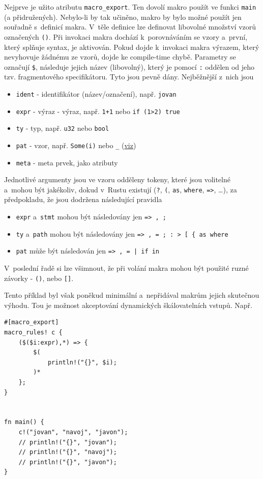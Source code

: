 \documentclass[a4paper, 12pt, twoside]{article} %
\newcommand{\rust}[1]{\texttt{#1}}
\begin{document}
			Nejprve je užito atributu \rust{macro_export}. Ten dovolí makro použít ve funkci \rust{main} (a přidružených). Nebylo-li by tak učiněno, makro by bylo možné použít jen souřadně s~definicí makra. V~těle definice lze definovat libovolné množství vzorů označených \rust{()}. Při invokaci makra dochází k~porovnáváním se vzory a~první, který splňuje syntax, je aktivován. Pokud dojde k~invokaci makra výrazem, který nevyhovuje žádnému ze vzorů, dojde ke compile-time chybě. Parametry se označují \texttt{\$}, následuje jejich název (libovolný), který je pomocí \texttt{:} oddělen od jeho tzv. fragmentového specifikátoru. Tyto jsou pevně dány. Nejběžnější z~nich jsou
			\begin{itemize}
				\item \rust{ident} - identifikátor (název/označení), např. \rust{jovan}
				\item \rust{expr}  - výraz - výraz, např. \rust{1+1} nebo \rust{if (1>2) {true}}
				\item \rust{ty}    - typ, např. \rust{u32} nebo \rust{bool}
				\item \rust{pat}   - vzor, např. \rust{Some(i)} nebo \rust{_} (\hyperlink{_}{viz})
				\item \rust{meta}  - meta prvek, jako atributy
			\end{itemize}\cite{makra}
			
			Jednotlivé argumenty jsou ve vzoru odděleny tokeny, které jsou volitelné a~mohou být jakékoliv, dokud v~Rustu existují (\rust{?}, \rust{(}, \rust{as}, \rust{where}, \rust{=>}, \dots), za předpokladu, že jsou dodržena následující pravidla
			\begin{itemize}
				\item \rust{expr} a~\rust{stmt} mohou být následovány jen \texttt{=> , ;}
				\item \rust{ty} a~\rust{path} mohou být následovány jen \texttt{=> , = ; : > [ \{ as where}
				\item \rust{pat} může být následován jen \texttt{=> , = | if in}
			\end{itemize}
			
			V~poslední řadě si lze všimnout, že při volání makra mohou být použité ruzné závorky - \rust{()}, \rust{{}} nebo \rust{[]}.
			
			Tento příklad byl však poněkud minimální a~nepřidával makrům jejich skutečnou výhodu. Tou je možnost akceptování dynamických škálovatelních vstupů. Např.
			\begin{verbatim}
#[macro_export]
macro_rules! c {
	($($i:expr),*) => { 
		$(
			println!("{}", $i);
		)*
	};
}


fn main() {
	c!("jovan", "navoj", "javon");
	// println!("{}", "jovan");
	// println!("{}", "navoj");
	// println!("{}", "javon");
}
			\end{verbatim}
			
\end{document}
